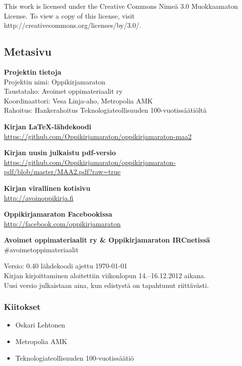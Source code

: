 This work is licensed under the Creative Commons Nimeä 3.0 Muokkaamaton License. To view a copy of this license, visit http://creativecommons.org/licenses/by/3.0/.

\newpage
\subsection*{Metasivu}

\textbf{Projektin tietoja} \\
Projektin nimi: Oppikirjamaraton \\
Taustataho: Avoimet oppimateriaalit ry \\
Koordinaattori: Vesa Linja-aho, Metropolia AMK \\
Rahoitus: Hankerahoitus Teknologiateollisuuden 100-vuotissäätiöltä

\textbf{Kirjan LaTeX-lähdekoodi} \\
\url{https://github.com/Oppikirjamaraton/oppikirjamaraton-maa2}

\textbf{Kirjan uusin julkaistu pdf-versio} \\
\url{https://github.com/Oppikirjamaraton/oppikirjamaraton-pdf/blob/master/MAA2.pdf?raw=true}

\textbf{Kirjan virallinen kotisivu} \\
\url{http://avoinoppikirja.fi}

\textbf{Oppikirjamaraton Facebookissa} \\
\url{http://facebook.com/oppikirjamaraton}

\textbf{Avoimet oppimateriaalit ry \& Oppikirjamaraton IRCnetissä} \\
\#avoimetoppimateriaalit

Versio: 0.40 \qquad lähdekoodi ajettu \today \\
Kirjan kirjoittaminen aloitettiin viikonlopun 14.--16.12.2012 aikana. \\
Uusi versio julkaistaan aina, kun edistystä on tapahtunut riittävästi.

\subsubsection*{Kiitokset}
\begin{itemize}
\item Oskari Lehtonen %
\item Metropolia AMK %
\item Teknologiateollisuuden 100-vuotissäätiö %
\end{itemize}

